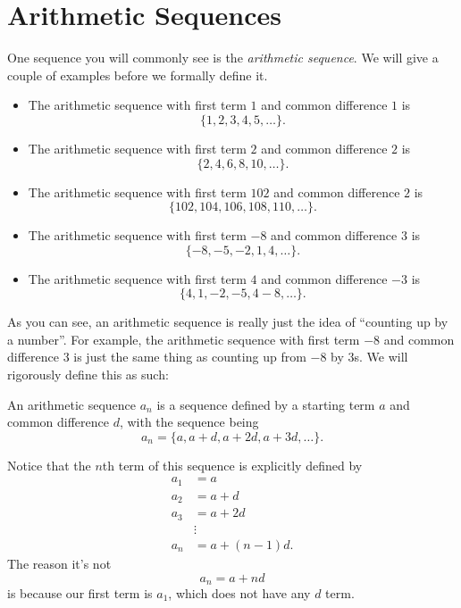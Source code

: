 \section{Arithmetic Sequences}

One sequence you will commonly see is the \emph{arithmetic sequence}. We will give a couple of examples before we formally define it.

\begin{example}\listhack
    \begin{itemize}
        \item The arithmetic sequence with first term $1$ and common difference $1$ is
        \[\{1,2,3,4,5,\dots\}.\]
        \item The arithmetic sequence with first term $2$ and common difference $2$ is
        \[\{2,4,6,8,10,\dots\}.\]
        \item The arithmetic sequence with first term $102$ and common difference $2$ is
        \[\{102,104,106,108,110,\dots\}.\]
        \item The arithmetic sequence with first term $-8$ and common difference $3$ is
        \[\{-8,-5,-2,1,4,\dots\}.\]
        \item The arithmetic sequence with first term $4$ and common difference $-3$ is
        \[\{4,1,-2,-5,4-8,\dots\}.\]
    \end{itemize}
\end{example}

As you can see, an arithmetic sequence is really just the idea of ``counting up by a number''. For example, the arithmetic sequence with first term $-8$ and common difference $3$ is just the same thing as counting up from $-8$ by $3$s. We will rigorously define this as such:

\begin{definition}
    An arithmetic sequence $a_n$ is a sequence defined by a starting term $a$ and common difference $d$, with the sequence being
    \[a_n=\{a, a+d, a+2d, a+3d,\dots\}.\]
\end{definition}

Notice that the $n$th term of this sequence is explicitly defined by
\begin{align*}
    a_1&=a\\
    a_2&=a+d\\
    a_3&=a+2d\\
    &\vdots\\
    a_n&=a+(n-1)d.
\end{align*}
The reason it's not
\[a_n=a+nd\]
is because our first term is $a_1$, which does not have any $d$ term. 

